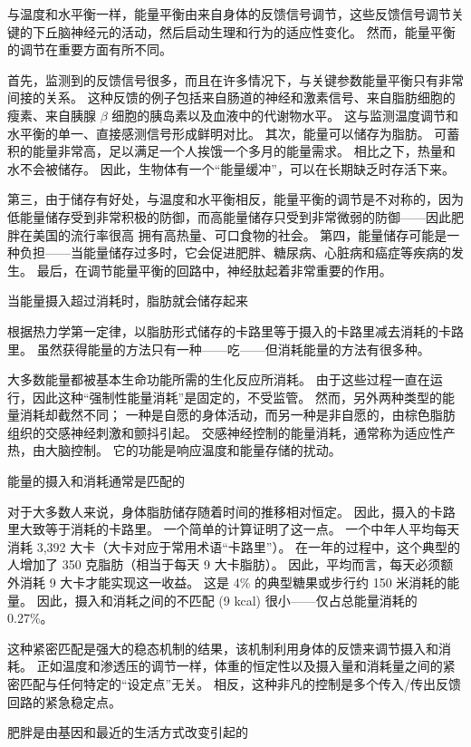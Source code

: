 与温度和水平衡一样，能量平衡由来自身体的反馈信号调节，这些反馈信号调节关键的下丘脑神经元的活动，然后启动生理和行为的适应性变化。
然而，能量平衡的调节在重要方面有所不同。


首先，监测到的反馈信号很多，而且在许多情况下，与关键参数能量平衡只有非常间接的关系。
这种反馈的例子包括来自肠道的神经和激素信号、来自脂肪细胞的瘦素、来自胰腺 $ \beta $ 细胞的胰岛素以及血液中的代谢物水平。
这与监测温度调节和水平衡的单一、直接感测信号形成鲜明对比。
其次，能量可以储存为脂肪。
可蓄积的能量非常高，足以满足一个人挨饿一个多月的能量需求。 相比之下，热量和水不会被储存。
因此，生物体有一个“能量缓冲”，可以在长期缺乏时存活下来。


第三，由于储存有好处，与温度和水平衡相反，能量平衡的调节是不对称的，因为低能量储存受到非常积极的防御，而高能量储存只受到非常微弱的防御——因此肥胖在美国的流行率很高 拥有高热量、可口食物的社会。
第四，能量储存可能是一种负担——当能量储存过多时，它会促进肥胖、糖尿病、心脏病和癌症等疾病的发生。
最后，在调节能量平衡的回路中，神经肽起着非常重要的作用。


当能量摄入超过消耗时，脂肪就会储存起来

根据热力学第一定律，以脂肪形式储存的卡路里等于摄入的卡路里减去消耗的卡路里。
虽然获得能量的方法只有一种——吃——但消耗能量的方法有很多种。


大多数能量都被基本生命功能所需的生化反应所消耗。
由于这些过程一直在运行，因此这种“强制性能量消耗”是固定的，不受监管。
然而，另外两种类型的能量消耗却截然不同；
一种是自愿的身体活动，而另一种是非自愿的，由棕色脂肪组织的交感神经刺激和颤抖引起。
交感神经控制的能量消耗，通常称为适应性产热，由大脑控制。
它的功能是响应温度和能量存储的扰动。


能量的摄入和消耗通常是匹配的

对于大多数人来说，身体脂肪储存随着时间的推移相对恒定。
因此，摄入的卡路里大致等于消耗的卡路里。 一个简单的计算证明了这一点。
一个中年人平均每天消耗 3,392 大卡（大卡对应于常用术语“卡路里”）。
在一年的过程中，这个典型的人增加了 350 克脂肪（相当于每天 9 大卡脂肪）。
因此，平均而言，每天必须额外消耗 9 大卡才能实现这一收益。
这是 4\% 的典型糖果或步行约 150 米消耗的能量。
因此，摄入和消耗之间的不匹配 (9 kcal) 很小——仅占总能量消耗的 0.27\%。


这种紧密匹配是强大的稳态机制的结果，该机制利用身体的反馈来调节摄入和消耗。
正如温度和渗透压的调节一样，体重的恒定性以及摄入量和消耗量之间的紧密匹配与任何特定的“设定点”无关。
相反，这种非凡的控制是多个传入/传出反馈回路的紧急稳定点。


肥胖是由基因和最近的生活方式改变引起的

